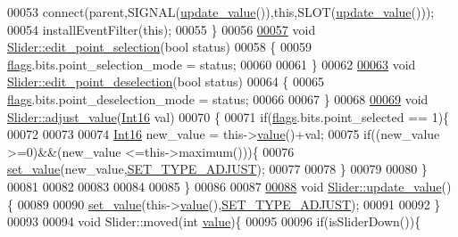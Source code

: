 \begin{DoxyCode}
00053     connect(parent,SIGNAL(\hyperlink{a00077_a4f62a01554ee8d975abe0cb136937695}{update\_value}()),\textcolor{keyword}{this},SLOT(\hyperlink{a00077_a4f62a01554ee8d975abe0cb136937695}{update\_value}()));
00054     installEventFilter(\textcolor{keyword}{this});
00055 \}
00056 
\hypertarget{a00133_source_l00057}{}\hyperlink{a00077_adeebaace74ff3add2acd9147e96fc0a6}{00057} \textcolor{keywordtype}{void} \hyperlink{a00077_adeebaace74ff3add2acd9147e96fc0a6}{Slider::edit\_point\_selection}(\textcolor{keywordtype}{bool} status)
00058 \{
00059     \hyperlink{a00077_ade6449558d429b66e5ed1381bc9b9060}{flags}.bits.point\_selection\_mode = status;
00060 
00061 \}
00062 
\hypertarget{a00133_source_l00063}{}\hyperlink{a00077_a105dff1f3ae7cfdcfabacd013428a501}{00063} \textcolor{keywordtype}{void} \hyperlink{a00077_a105dff1f3ae7cfdcfabacd013428a501}{Slider::edit\_point\_deselection}(\textcolor{keywordtype}{bool} status)
00064 \{
00065     \hyperlink{a00077_ade6449558d429b66e5ed1381bc9b9060}{flags}.bits.point\_deselection\_mode = status;
00066 
00067 \}
00068 
\hypertarget{a00133_source_l00069}{}\hyperlink{a00077_a521ac5143857dd652a0bafa77389fa81}{00069} \textcolor{keywordtype}{void} \hyperlink{a00077_a521ac5143857dd652a0bafa77389fa81}{Slider::adjust\_value}(\hyperlink{a00004_a3985266aecb120f269789241c170850c}{Int16} val)
00070 \{
00071     \textcolor{keywordflow}{if}(\hyperlink{a00077_ade6449558d429b66e5ed1381bc9b9060}{flags}.bits.point\_selected == 1)\{
00072 
00073 
00074     \hyperlink{a00004_a3985266aecb120f269789241c170850c}{Int16} new\_value = this->\hyperlink{a00116_aee90379adb0307effb138f4871edbc5c}{value}()+val;
00075     \textcolor{keywordflow}{if}((new\_value >=0)&&(new\_value <=this->maximum()))\{
00076         \hyperlink{a00077_ae3010d3de02715db2f443560d7d2a27b}{set\_value}(new\_value,\hyperlink{a00090_a16b6b7b5ad68ec0dd62a3c9e97f88adb}{SET\_TYPE\_ADJUST});
00077 
00078     \}
00079 
00080     \}
00081 
00082 
00083 
00084 
00085 \}
00086 
00087 
\hypertarget{a00133_source_l00088}{}\hyperlink{a00077_a4f62a01554ee8d975abe0cb136937695}{00088} \textcolor{keywordtype}{void} \hyperlink{a00077_a4f62a01554ee8d975abe0cb136937695}{Slider::update\_value}()\{
00089 
00090     \hyperlink{a00077_ae3010d3de02715db2f443560d7d2a27b}{set\_value}(this->\hyperlink{a00116_aee90379adb0307effb138f4871edbc5c}{value}(),\hyperlink{a00090_a16b6b7b5ad68ec0dd62a3c9e97f88adb}{SET\_TYPE\_ADJUST});
00091 
00092 \}
00093 
00094 \textcolor{keywordtype}{void} Slider::moved(\textcolor{keywordtype}{int} \hyperlink{a00116_aee90379adb0307effb138f4871edbc5c}{value})\{
00095 
00096     \textcolor{keywordflow}{if}(isSliderDown())\{

\end{DoxyCode}
